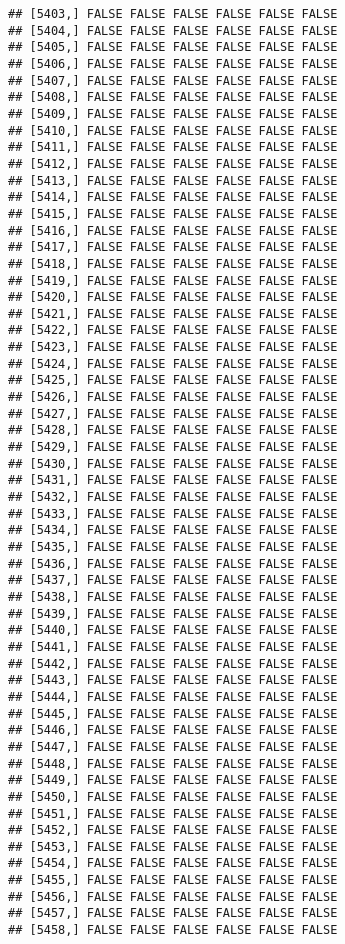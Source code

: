 \documentclass[
]{article}
\begin{document}
\begin{verbatim}
## [5403,] FALSE FALSE FALSE FALSE FALSE FALSE
## [5404,] FALSE FALSE FALSE FALSE FALSE FALSE
## [5405,] FALSE FALSE FALSE FALSE FALSE FALSE
## [5406,] FALSE FALSE FALSE FALSE FALSE FALSE
## [5407,] FALSE FALSE FALSE FALSE FALSE FALSE
## [5408,] FALSE FALSE FALSE FALSE FALSE FALSE
## [5409,] FALSE FALSE FALSE FALSE FALSE FALSE
## [5410,] FALSE FALSE FALSE FALSE FALSE FALSE
## [5411,] FALSE FALSE FALSE FALSE FALSE FALSE
## [5412,] FALSE FALSE FALSE FALSE FALSE FALSE
## [5413,] FALSE FALSE FALSE FALSE FALSE FALSE
## [5414,] FALSE FALSE FALSE FALSE FALSE FALSE
## [5415,] FALSE FALSE FALSE FALSE FALSE FALSE
## [5416,] FALSE FALSE FALSE FALSE FALSE FALSE
## [5417,] FALSE FALSE FALSE FALSE FALSE FALSE
## [5418,] FALSE FALSE FALSE FALSE FALSE FALSE
## [5419,] FALSE FALSE FALSE FALSE FALSE FALSE
## [5420,] FALSE FALSE FALSE FALSE FALSE FALSE
## [5421,] FALSE FALSE FALSE FALSE FALSE FALSE
## [5422,] FALSE FALSE FALSE FALSE FALSE FALSE
## [5423,] FALSE FALSE FALSE FALSE FALSE FALSE
## [5424,] FALSE FALSE FALSE FALSE FALSE FALSE
## [5425,] FALSE FALSE FALSE FALSE FALSE FALSE
## [5426,] FALSE FALSE FALSE FALSE FALSE FALSE
## [5427,] FALSE FALSE FALSE FALSE FALSE FALSE
## [5428,] FALSE FALSE FALSE FALSE FALSE FALSE
## [5429,] FALSE FALSE FALSE FALSE FALSE FALSE
## [5430,] FALSE FALSE FALSE FALSE FALSE FALSE
## [5431,] FALSE FALSE FALSE FALSE FALSE FALSE
## [5432,] FALSE FALSE FALSE FALSE FALSE FALSE
## [5433,] FALSE FALSE FALSE FALSE FALSE FALSE
## [5434,] FALSE FALSE FALSE FALSE FALSE FALSE
## [5435,] FALSE FALSE FALSE FALSE FALSE FALSE
## [5436,] FALSE FALSE FALSE FALSE FALSE FALSE
## [5437,] FALSE FALSE FALSE FALSE FALSE FALSE
## [5438,] FALSE FALSE FALSE FALSE FALSE FALSE
## [5439,] FALSE FALSE FALSE FALSE FALSE FALSE
## [5440,] FALSE FALSE FALSE FALSE FALSE FALSE
## [5441,] FALSE FALSE FALSE FALSE FALSE FALSE
## [5442,] FALSE FALSE FALSE FALSE FALSE FALSE
## [5443,] FALSE FALSE FALSE FALSE FALSE FALSE
## [5444,] FALSE FALSE FALSE FALSE FALSE FALSE
## [5445,] FALSE FALSE FALSE FALSE FALSE FALSE
## [5446,] FALSE FALSE FALSE FALSE FALSE FALSE
## [5447,] FALSE FALSE FALSE FALSE FALSE FALSE
## [5448,] FALSE FALSE FALSE FALSE FALSE FALSE
## [5449,] FALSE FALSE FALSE FALSE FALSE FALSE
## [5450,] FALSE FALSE FALSE FALSE FALSE FALSE
## [5451,] FALSE FALSE FALSE FALSE FALSE FALSE
## [5452,] FALSE FALSE FALSE FALSE FALSE FALSE
## [5453,] FALSE FALSE FALSE FALSE FALSE FALSE
## [5454,] FALSE FALSE FALSE FALSE FALSE FALSE
## [5455,] FALSE FALSE FALSE FALSE FALSE FALSE
## [5456,] FALSE FALSE FALSE FALSE FALSE FALSE
## [5457,] FALSE FALSE FALSE FALSE FALSE FALSE
## [5458,] FALSE FALSE FALSE FALSE FALSE FALSE

\end{verbatim}
\end{document}
